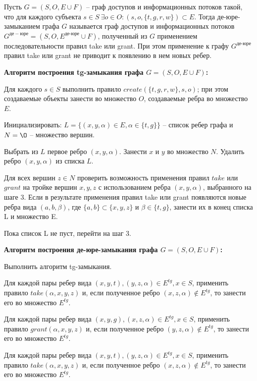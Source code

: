 \begin{defs}
	Пусть $G = (S, O, E \cup F)$ -- граф доступов и информационных потоков такой, что для каждого субъекта 
	$s \in S \ \exists o \in O : (s,o,\{t,g,r,w\}) \subset E$. Тогда де-юре-замыканием 
	графа $G$ называется граф доступов и информационных потоков $G^{де-юре} = (S, O, E^{\text{де-юре}} \cup F)$, полученный 
	из $G$ применением последовательности правил take или grant. При этом применение к графу $G^{\text{де-юре}}$ правил 
	take или grant не приводит к появлению в нем новых ребер.
\end{defs}

\textbf{Алгоритм построения tg-замыкания графа $G = (S,O,E \cup F)$:}
\begin{enumerate*}
	\item Для каждого $s \in S$ выполнить правило $create(\{t,g,r,w\}, s,o)$; 
	при этом создаваемые объекты занести во множество $O$, создаваемые ребра во множество $E$.
	\item Инициализировать: $L = \{(x,y,\alpha) \in E, \alpha \in \{t,g\}\}$ -- список ребер
	графа и $N = \O$ -- множество вершин.	
	\item Выбрать из $L$ первое ребро $(x,y,\alpha)$. Занести $x$ и $y$ во множество $N$. 
	Удалить ребро $(x,y,\alpha)$ из списка $L$.
	\item Для всех вершин $z \in N$ проверить возможность применения правил $take$ или $grant$ 
	на тройке вершин $x,y,z$ с использованием ребра $(x,y,\alpha)$, выбранного на шаге 3.
	Если в результате применения правил take или grant появляются новые ребра вида $(a,b,\beta)$,
	где $\{a,b\} \subset \{x,y,z\}$ и $\beta \in \{t,g\}$, занести их в конец списка L и 
	множество E.
	\item Пока список L не пуст, перейти на шаг 3.
\end{enumerate*}

\textbf{Алгоритм построения де-юре-замыкания графа $G = (S,O,E \cup F)$:}
\begin{enumerate*}
	\item Выполнить алгоритм tg-замыкания.
	\item Для каждой пары ребер вида $(x,y,t),(y,z,\alpha) \in E^{tg}, x \in S$, применить правило
	$take(\alpha, x, y, z)$ и, если полученное ребро $(x,z,\alpha) \notin E^{tg}$, то занести
	его во множество $E^{tg}$.
	\item Для каждой пары ребер вида $(x,y,g),(x,z,\alpha) \in E^{tg}, x \in S$, применить правило
	$grant(\alpha, x, y, z)$ и, если полученное ребро $(y,z,\alpha) \notin E^{tg}$, то занести
	его во множество $E^{tg}$.
	\item Для каждой пары ребер вида $(x,y,t),(y,z,\alpha) \in E^{tg}, x \in S$, применить правило
	$take(\alpha, x, y, z)$ и, если полученное ребро $(x,z,\alpha) \notin E^{tg}$, то занести
	его во множество $E^{tg}$.
\end{enumerate*}

